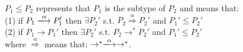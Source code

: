  \begin{myDef}[Subtype]
$P_{1} \le P_{2}$ represents that $P_{1}$ is the subtype of $P_{2}$ and  means that: \\
(1) if $P_{1} \xlongrightarrow{\alpha}  P_{1}'$ then $\exists P_{2}' $ s.t. $P_{2} \overset{\text{$\alpha$}}{\Longrightarrow} P_{2}'$ and $ P_{1}' \le P_{2}' $\\
(2) if $P_{1} \rightarrow P_{1}'$ then $\exists P_{2}'$ s.t. $P_{2} \rightarrow^{*} P_{2}'$ and  $P_{1}' \le P_{2}'$\\
where $\overset{\text{$\alpha$}}{\Longrightarrow}$ means that: $\rightarrow^{*} \xlongrightarrow{\alpha} \rightarrow^{*}$.
\label{df:subtype}
\end{myDef}

